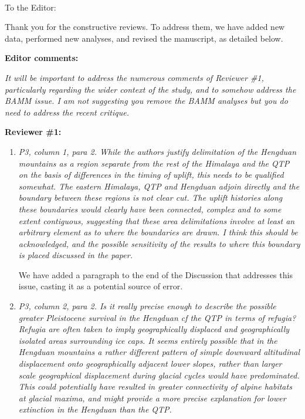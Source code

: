 \documentclass[12pt]{letter}
\begin{document}
\raggedright{}


\begin{letter}{ \\

}
\address{Integrative Research Center\\
  The Field Museum\\
  1400 South Lake Shore Drive\\
  Chicago, IL  60605-2496\\
  USA}

\opening{To the Editor:}

Thank you for the constructive reviews. To address them, we have added
new data, performed new analyses, and revised the manuscript, as
detailed below.


\textbf{Editor comments:}

\textit{It will be important to address the numerous comments of
  Reviewer \#1, particularly regarding the wider context of the study,
  and to somehow address the BAMM issue. I am not suggesting you
  remove the BAMM analyses but you do need to address the recent
  critique.}

\textbf{Reviewer \#1:}

\begin{enumerate}
\item \textit{P3, column 1, para 2. While the authors justify
    delimitation of the Hengduan mountains as a region separate from
    the rest of the Himalaya and the QTP on the basis of differences
    in the timing of uplift, this needs to be qualified somewhat. The
    eastern Himalaya, QTP and Hengduan adjoin directly and the
    boundary between these regions is not clear cut. The uplift
    histories along these boundaries would clearly have been
    connected, complex and to some extent contiguous, suggesting that
    these area delimitations involve at least an arbitrary element as
    to where the boundaries are drawn. I think this should be
    acknowledged, and the possible sensitivity of the results to where
    this boundary is placed discussed in the paper.}

  We have added a paragraph to the end of the Discussion that
  addresses this issue, casting it as a potential source of error.

\item \textit{P3, column 2, para 2. Is it really precise enough to
    describe the possible greater Pleistocene survival in the Hengduan
    cf the QTP in terms of refugia? Refugia are often taken to imply
    geographically displaced and geographically isolated areas
    surrounding ice caps. It seems entirely possible that in the
    Hengduan mountains a rather different pattern of simple downward
    altitudinal displacement onto geographically adjacent lower
    slopes, rather than larger scale geographical displacement during
    glacial cycles would have predominated. This could potentially
    have resulted in greater connectivity of alpine habitats at
    glacial maxima, and might provide a more precise explanation for
    lower extinction in the Hengduan than the QTP.}


\end{enumerate}
\end{letter}
\end{document}
